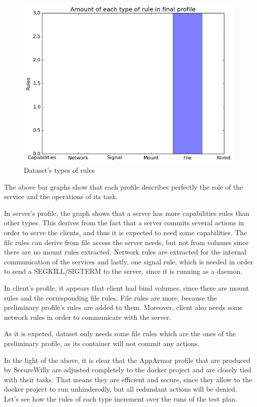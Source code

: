 \hfill\break\hfill\break\hfill\break\hfill\break\hfill\break\hfill\break\hfill\break\hfill\break\hfill\break\hfill\break\hfill\break\hfill\break\hfill\break\hfill\break\hfill\break\hfill\break\hfill\break

\begin{figure}[h!]
  \centering
   \includegraphics[width=0.64\linewidth]{./figures/mediastreaming/plots_with_grid/Barfinal_cloudsuitemedia-streamingdataset.png}
   \caption{Dataset's types of rules}
\end{figure}

The above bar graphs show that each profile describes perfectly the role of the service and the operations of its task.

In server's profile, the graph shows that a server has more capabilities rules than other types. This derives from the fact that a server commits several actions in order to serve the clients, and thus it is expected to need some capabilities. The file rules can derive from file access the server needs, but not from volumes since there are no mount rules extracted. Network rules are extracted for the internal communication of the services and lastly, one signal rule, which is needed in order to send a SEGKILL/SIGTERM to the server, since it is running as a daemon.

In client's profile, it appears that client had bind volumes, since there are mount rules and the corresponding file rules. File rules are more, because the preliminary profile's rules are added to them. Moreover, client also needs some network rules in order to communicate with the server.

As it is expeted, dataset only needs some file rules which are the ones of the preliminary profile, as its container will not commit any actions.

In the light of the above, it is clear that the AppArmor profile that are produced by SecureWilly are adjusted completely to the docker project and are closely tied with their tasks. That means they are efficient and secure, since they allow to the docker project to run unhinderedly, but all redundant actions will be denied.
\\
Let's see how the rules of each type increment over the runs of the test plan.


